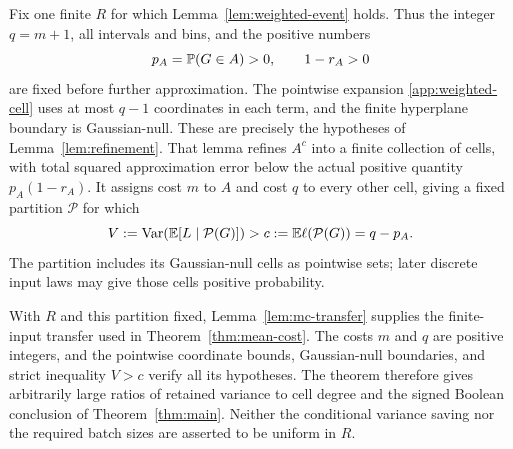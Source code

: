Fix one finite $R$ for which Lemma~\ref{lem:weighted-event} holds.
Thus the integer $q=m+1$, all intervals and bins, and the positive
numbers
\begin{equation}\label{app:weighted-saving}
 p_A=\mathbb P(G\in A)>0,\qquad 1-r_A>0
\end{equation}
are fixed before further approximation. The pointwise expansion
\eqref{app:weighted-cell} uses at most $q-1$ coordinates in each
term, and the finite hyperplane boundary is Gaussian-null. These
are precisely the hypotheses of Lemma~\ref{lem:refinement}.
That lemma refines $A^c$ into a finite collection of cells, with
total squared approximation error below the actual positive quantity
$p_A(1-r_A)$. It assigns cost $m$ to $A$ and cost $q$ to every
other cell, giving a fixed partition $\mathcal P$ for which
\begin{equation}\label{app:weighted-mean-cost-gain}
 V:=\operatorname{Var}(\mathbb E[L\mid\mathcal P(G)])>
 c:=\mathbb E\ell(\mathcal P(G))=q-p_A.
\end{equation}
The partition includes its Gaussian-null cells as pointwise sets;
later discrete input laws may give those cells positive probability.

With $R$ and this partition fixed, Lemma~\ref{lem:mc-transfer}
supplies the finite-input transfer used in Theorem~\ref{thm:mean-cost}.
The costs $m$ and $q$ are positive integers, and the pointwise coordinate
bounds, Gaussian-null boundaries, and strict inequality $V>c$ verify
all its hypotheses. The theorem therefore gives arbitrarily large
ratios of retained variance to cell degree and the signed Boolean conclusion
of Theorem~\ref{thm:main}. Neither the conditional variance saving nor
the required batch sizes are asserted to be uniform in $R$.
